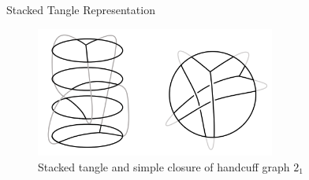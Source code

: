 \documentclass[final]{beamer}
\begin{document}
\begin{frame}[t]
\begin{columns}[t]
\begin{block}{Stacked Tangle Representation}
  

  \begin{figure}
      \centering
      \includegraphics[width=0.7\textwidth]{../Midterm_Poster/figure/stacked_tangle.png}
      \caption{Stacked tangle and simple closure of handcuff graph $2_1$}
  \end{figure}

  \end{block}
\end{columns}


\end{frame}
\end{document}
